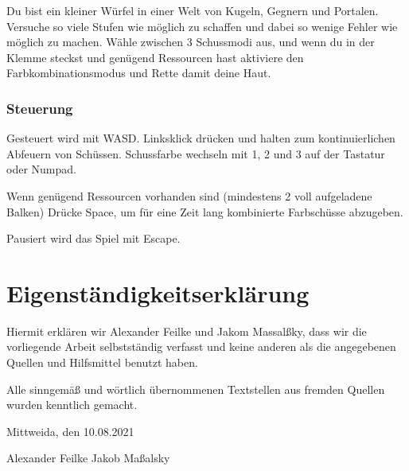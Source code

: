 \documentclass[a4paper,ngerman,12pt]{report}
\begin{document}
Du bist ein kleiner Würfel in einer Welt von Kugeln, Gegnern und Portalen. Versuche so viele Stufen wie möglich zu schaffen und dabei so wenige Fehler wie möglich zu machen. Wähle zwischen 3 Schussmodi aus, und wenn du in der Klemme steckst und genügend Ressourcen hast aktiviere den Farbkombinationsmodus und Rette damit deine Haut.



\subsection{Steuerung}

Gesteuert wird mit WASD. Linksklick drücken und halten zum kontinuierlichen Abfeuern von Schüssen. Schussfarbe wechseln mit 1, 2 und 3 auf der Tastatur oder Numpad.

Wenn genügend Ressourcen vorhanden sind (mindestens 2 voll aufgeladene Balken) Drücke Space, um für eine Zeit lang kombinierte Farbschüsse abzugeben.

Pausiert wird das Spiel mit Escape.





\chapter{Eigenständigkeitserklärung}

Hiermit erklären wir Alexander Feilke und Jakom Massal{\ss}ky, dass wir die vorliegende Arbeit selbstständig verfasst und keine anderen als die angegebenen Quellen und Hilfsmittel benutzt haben.

Alle sinngemä{\ss} und wörtlich übernommenen Textstellen aus fremden Quellen wurden kenntlich gemacht.

Mittweida, den 10.08.2021

\vspace{2cm}


Alexander Feilke \hspace{4cm} Jakob Ma{\ss}alsky
\end{document}
